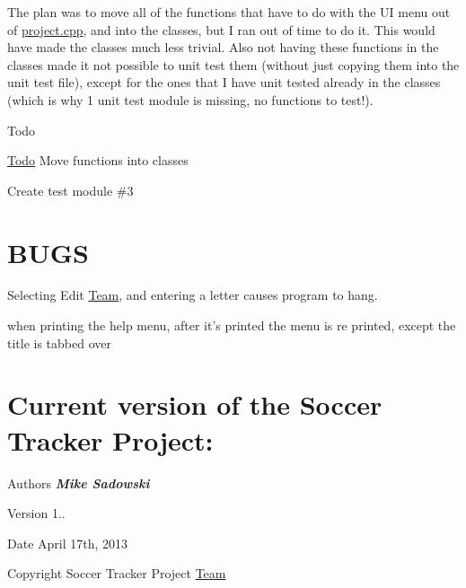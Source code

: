 \begin{DoxyItemize}
\item The plan was to move all of the functions that have to do with the U\-I menu out of \hyperlink{project_8cpp}{project.\-cpp}, and into the classes, but I ran out of time to do it. This would have made the classes much less trivial. Also not having these functions in the classes made it not possible to unit test them (without just copying them into the unit test file), except for the ones that I have unit tested already in the classes (which is why 1 unit test module is missing, no functions to test!).
\end{DoxyItemize}

\begin{DoxyRefDesc}{Todo}
\item[\hyperlink{todo__todo000001}{Todo}]Move functions into classes 

Create test module \#3\end{DoxyRefDesc}




 \hypertarget{index_bugs}{}\section{B\-U\-G\-S}\label{index_bugs}

\begin{DoxyItemize}
\item Selecting Edit \hyperlink{class_team}{Team}, and entering a letter causes program to hang.
\item when printing the help menu, after it's printed the menu is re printed, except the title is tabbed over
\end{DoxyItemize}



 \hypertarget{index_version}{}\section{Current version of the Soccer Tracker Project\-:}\label{index_version}

\begin{DoxyItemize}
\item \begin{DoxyAuthor}{Authors}
{\bfseries {\itshape Mike Sadowski}} 
\end{DoxyAuthor}

\item \begin{DoxyVersion}{Version}
1.. 
\end{DoxyVersion}

\item \begin{DoxyDate}{Date}
April 17th, 2013 
\end{DoxyDate}

\item \begin{DoxyCopyright}{Copyright}
Soccer Tracker Project \hyperlink{class_team}{Team} 
\end{DoxyCopyright}

\end{DoxyItemize}